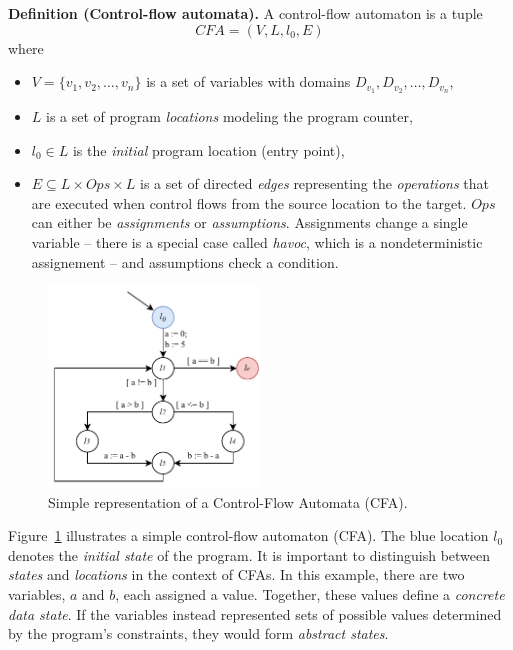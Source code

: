 \noindent\textbf{Definition \label{def:cfa}(Control-flow automata).} 
A control-flow automaton is a tuple 
\[
\textit{CFA} = (V, L, l_0, E)
\]
where
\begin{itemize}
  \item $V = \{v_1, v_2, \ldots, v_n\}$ is a set of variables with domains $D_{v_1}, D_{v_2}, \ldots, D_{v_n}$,
  \item $L$ is a set of program \textit{locations} modeling the program counter,
  \item $l_0 \in L$ is the \textit{initial} program location (entry point),
  \item $E \subseteq L \times Ops \times L$ is a set of directed \textit{edges} representing the \textit{operations} that are executed when control flows from the source location to the target. $ Ops $ can either be \textit{assignments} or \textit{assumptions}. Assignments change a single variable -- there is a special case called \textit{havoc}, which is a nondeterministic assignement -- and assumptions check a condition.
\end{itemize}

\begin{figure}
  \centering
  \includegraphics[width=0.5\textwidth]{figures/cfa_simple.drawio.pdf}
  \caption{Simple representation of a Control-Flow Automata (CFA).}
  \label{fig:cfa}
\end{figure}

Figure~\ref{fig:cfa} illustrates a simple control-flow automaton (CFA). The blue location $l_0$ denotes the \textit{initial state} of the program. It is important to distinguish between \textit{states} and \textit{locations} in the context of CFAs. In this example, there are two variables, $a$ and $b$, each assigned a value. Together, these values define a \textit{concrete data state}. If the variables instead represented sets of possible values determined by the program's constraints, they would form \textit{abstract states}.


